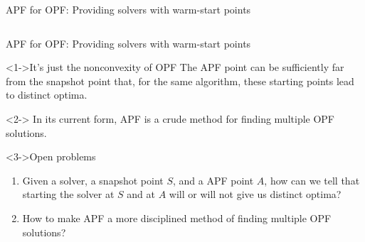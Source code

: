 \begin{frame}[t]{APF for OPF: Providing solvers with warm-start points}{}
\begin{columns}[T]
\begin{column}{0.5\textwidth}
    \end{column}
    \end{columns}
\end{frame}

\begin{frame}[t]{APF for OPF: Providing solvers with warm-start points}{}
    \begin{block}<1->{It's just the nonconvexity of OPF}
        The APF point
        \textcolor<1->{CornellRed}{can be sufficiently far} from the snapshot point
        that, for \textcolor<1->{CornellRed}{the same algorithm},
        these starting points lead to \textcolor<1->{CornellRed}{distinct optima}.
    \end{block}

    \begin{corollary}<2->{}
        In its current form, APF is
        \textcolor<2->{CornellRed}{a crude method for finding multiple OPF solutions}.
    \end{corollary}

    \begin{alertblock}<3->{Open problems}
    \begin{enumerate}
        \item Given a solver, a snapshot point \(S\), and a APF point \(A\),
            how can we tell that starting the solver at \(S\) and at \(A\)
            will or will not give us distinct optima?
        \item How to make APF a more disciplined method of finding multiple OPF solutions?
    \end{enumerate}
    \end{alertblock}
\end{frame}
